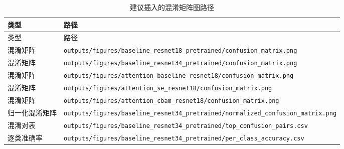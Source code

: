 \documentclass[UTF8]{ctexart}
\begin{document}
\begin{longtable}{p{}p{}}
\caption{建议插入的混淆矩阵图路径}
\label{tab:confusion-list}\\
\toprule
类型 & 路径 \\
\midrule
\endfirsthead
\toprule
类型 & 路径 \\
\midrule
\endhead
混淆矩阵 & \verb|outputs/figures/baseline_resnet18_pretrained/confusion_matrix.png| \\
混淆矩阵 & \verb|outputs/figures/baseline_resnet34_pretrained/confusion_matrix.png| \\
混淆矩阵 & \verb|outputs/figures/attention_baseline_resnet18/confusion_matrix.png| \\
混淆矩阵 & \verb|outputs/figures/attention_se_resnet18/confusion_matrix.png| \\
混淆矩阵 & \verb|outputs/figures/attention_cbam_resnet18/confusion_matrix.png| \\
归一化混淆矩阵 & \verb|outputs/figures/baseline_resnet34_pretrained/normalized_confusion_matrix.png| \\
混淆对表 & \verb|outputs/figures/baseline_resnet34_pretrained/top_confusion_pairs.csv| \\
逐类准确率 & \verb|outputs/figures/baseline_resnet34_pretrained/per_class_accuracy.csv| \\
\bottomrule
\end{longtable}
\end{document}
